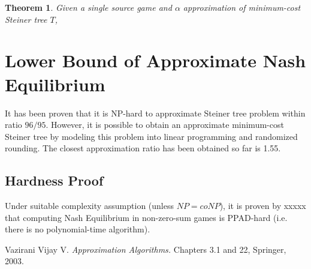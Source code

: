\documentclass[11pt,psfig,times]{article}
\newtheorem{theorem}{Theorem}[section]
\begin{document}
\begin{theorem}
	Given a single source game and \(\alpha\) approximation of minimum-cost Steiner tree \(T\), 
\end{theorem}

\section{Lower Bound of Approximate Nash Equilibrium}
It has been proven that it is NP-hard to approximate Steiner tree problem within ratio \(96/95\). However, it is possible to obtain an approximate minimum-cost Steiner tree by modeling this problem into linear programming and randomized rounding. The closest approximation ratio has been obtained so far is 1.55.
\subsection{Hardness Proof}	
Under suitable complexity assumption (unless \(NP = coNP\)), it is proven by xxxxx that computing Nash Equilibrium in non-zero-sum games is PPAD-hard (i.e. there is no polynomial-time algorithm).

\begin{thebibliography}{10}
	\setlength{\itemsep}{0pt plus .3pt}
	\setlength{\parsep}{0pt plus .3pt}
	\setlength{\parskip}{0pt plus .3pt}
Vazirani Vijay V. {\em Approximation Algorithms.\/} Chapters 3.1 and 22, Springer, 2003.
\end{thebibliography}
\end{document}

